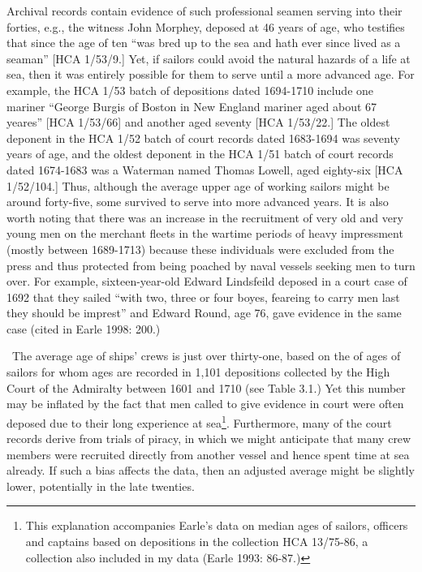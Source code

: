\begin{styleStandard}
Archival records contain evidence of such professional seamen serving into their forties, e.g., the witness John Morphey, deposed at 46 years of age, who testifies that since the age of ten “was bred up to the sea and hath ever since lived as a seaman” [HCA 1/53/9.] Yet, if sailors could avoid the natural hazards of a life at sea, then it was entirely possible for them to serve until a more advanced age. For example, the HCA 1/53 batch of depositions dated 1694-1710 include one mariner “George Burgis of Boston in New England mariner aged about 67 yeares” [HCA 1/53/66] and another aged seventy [HCA 1/53/22.] The oldest deponent in the HCA 1/52 batch of court records dated 1683-1694 was seventy years of age, and the oldest deponent in the HCA 1/51 batch of court records dated 1674-1683 was a Waterman named Thomas Lowell, aged eighty-six [HCA 1/52/104.] Thus, although the average upper age of working sailors might be around forty-five, some survived to serve into more advanced years. It is also worth noting that there was an increase in the recruitment of very old and very young men on the merchant fleets in the wartime periods of heavy impressment (mostly between 1689-1713) because these individuals were excluded from the press and thus protected from being poached by naval vessels seeking men to turn over. For example, sixteen-year-old Edward Lindsfeild deposed in a court case of 1692 that they sailed “with two, three or four boyes, feareing to carry men last they should be imprest” and Edward Round, age 76, gave evidence in the same case (cited in Earle 1998: 200.) 
\end{styleStandard}

\begin{styleStandard}
\ The average age of ships’ crews is just over thirty-one, based on the of ages of sailors for whom ages are recorded in 1,101 depositions collected by the High Court of the Admiralty between 1601 and 1710 (see Table 3.1.) Yet this number may be inflated by the fact that men called to give evidence in court were often deposed due to their long experience at sea\footnote{ This explanation accompanies Earle’s data on median ages of sailors, officers and captains based on depositions in the collection HCA 13/75-86, a collection also included in my data (Earle 1993: 86-87.)}. Furthermore, many of the court records derive from trials of piracy, in which we might anticipate that many crew members were recruited directly from another vessel and hence spent time at sea already. If such a bias affects the data, then an adjusted average might be slightly lower, potentially in the late twenties.
\end{styleStandard}

